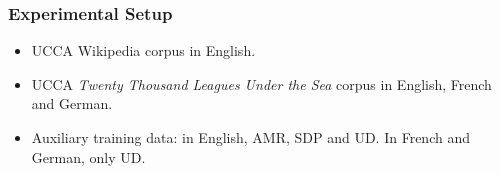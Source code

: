 \documentclass[t,xcolor={svgnames}]{beamer}
\begin{document}
\begin{frame}
\frametitle{Experimental Setup}
\begin{itemize}
 \item UCCA Wikipedia corpus in English.
 \item UCCA \textit{Twenty Thousand Leagues Under the Sea} corpus in English, French and German.
 \item Auxiliary training data: in English, AMR, SDP and UD. In French and German, only UD.
\end{itemize}

\vfill


\end{frame}
\end{document}

